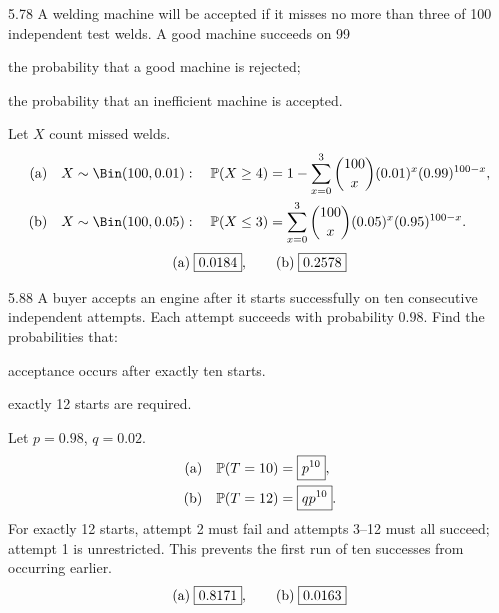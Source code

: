 \documentclass[11pt,oneside]{article}
\begin{document}
\begin{exercise}{5.78}
A welding machine will be accepted if it misses no more than three of 100 independent test welds. A good machine succeeds on 99%
\par
\begin{exercisesubparts}
\item the probability that a good machine is rejected;
\item the probability that an inefficient machine is accepted.
\end{exercisesubparts}
\end{exercise}

\begin{solution}
Let $X$ count missed welds.
\begin{align*}
\textup{(a)}\quad&X\sim\Bin(100,0.01):\quad
\Prob(X\ge4)=1-\sum_{x=0}^3\binom{100}{x}(0.01)^x(0.99)^{100-x},\\
\textup{(b)}\quad&X\sim\Bin(100,0.05):\quad
\Prob(X\le3)=\sum_{x=0}^3\binom{100}{x}(0.05)^x(0.95)^{100-x}.
\end{align*}
\[
\textup{(a)}\;\boxed{0.0184},\qquad \textup{(b)}\;\boxed{0.2578}
\]
\end{solution}

\begin{exercise}{5.88}
A buyer accepts an engine after it starts successfully on ten consecutive independent attempts. Each attempt succeeds with probability $0.98$. Find the probabilities that:
\begin{exercisesubparts}
\item acceptance occurs after exactly ten starts.
\item exactly 12 starts are required.
\end{exercisesubparts}
\end{exercise}

\begin{solution}
Let $p=0.98$, $q=0.02$.
\begin{align*}
\textup{(a)}\quad&\mathbb{P}(T=10)=\boxed{p^{10}},\\
\textup{(b)}\quad&\mathbb{P}(T=12)=\boxed{qp^{10}}.
\end{align*}
For exactly 12 starts, attempt 2 must fail and attempts 3--12 must all succeed; attempt 1 is unrestricted. This prevents the first run of ten successes from occurring earlier.
\[
\textup{(a)}\;\boxed{0.8171},\qquad \textup{(b)}\;\boxed{0.0163}
\]
\end{solution}
\end{document}
